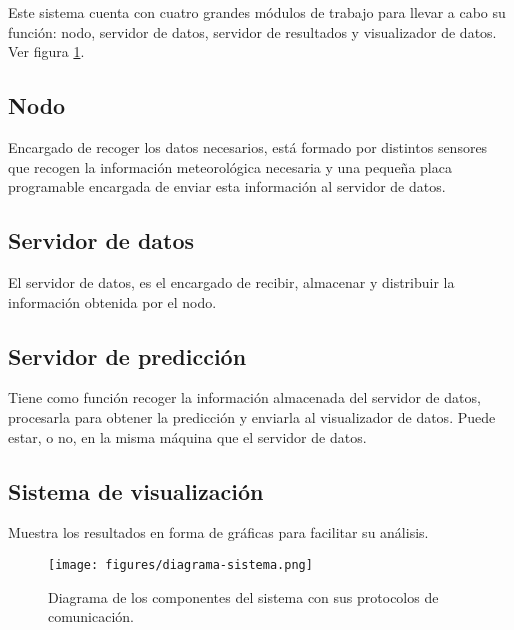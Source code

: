 Este sistema cuenta con cuatro grandes módulos de trabajo para llevar a cabo su función: nodo, servidor de datos, servidor de resultados y visualizador de datos. Ver figura \ref{diagrama-sistema}.

\subsection{Nodo}
\label{makereference1.2.1}
Encargado de recoger los datos necesarios, está formado por distintos sensores que recogen la información meteorológica necesaria y una pequeña placa programable encargada de enviar esta información al servidor de datos.

\subsection{Servidor de datos}
\label{makereference1.2.2}
El servidor de datos, es el encargado de recibir, almacenar y distribuir la información obtenida por el nodo.

\subsection{Servidor de predicción}
\label{makereference1.2.3}
Tiene como función recoger la información almacenada del servidor de datos, procesarla para obtener la predicción y enviarla al visualizador de datos. Puede estar, o no, en la misma máquina que el servidor de datos.

\subsection{Sistema de visualización}
\label{makereference1.2.4}
Muestra los resultados en forma de gráficas para facilitar su análisis.

\begin{figure}[htb]
    \begin{center}
        \texttt{[image: figures/diagrama-sistema.png]}
        \caption{Diagrama de los componentes del sistema con sus protocolos de comunicación. \label{diagrama-sistema}}
    \end{center}
\end{figure}
